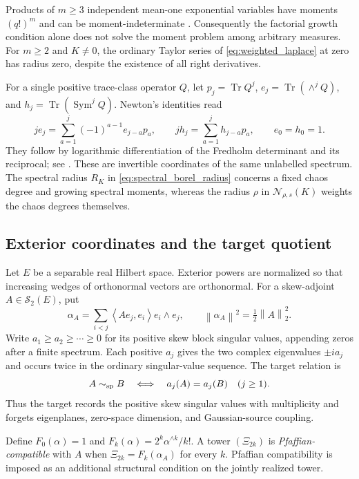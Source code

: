 \documentclass[11pt,a4paper]{amsart}
\numberwithin{equation}{section}
\theoremstyle{definition}
\theoremstyle{remark}
\newcommand{\Sch}{\mathcal S}
\DeclareMathOperator{\Tr}{Tr}
\DeclareMathOperator{\Sym}{Sym}
\newcommand{\norm}[1]{\left\lVert#1\right\rVert}
\newcommand{\ip}[2]{\left\langle#1,#2\right\rangle}
\newcommand{\Nn}[2]{\mathcal N_{#1,s}(#2)}
\begin{document}
Products of $m\ge3$ independent mean-one exponential variables have moments $(q!)^m$ and can be moment-indeterminate \cite{LS}. Consequently the factorial growth condition alone does not solve the moment problem among arbitrary measures. For $m\ge2$ and $K\ne0$, the ordinary Taylor series of \eqref{eq:weighted_laplace} at zero has radius zero, despite the existence of all right derivatives.

For a single positive trace-class operator $Q$, let $p_j=\Tr Q^j$, $e_j=\Tr(\wedge^jQ)$, and $h_j=\Tr(\Sym^jQ)$. Newton's identities read
\begin{equation}\label{eq:newton_spectral}
 je_j=\sum_{a=1}^j(-1)^{a-1}e_{j-a}p_a,\qquad
 jh_j=\sum_{a=1}^jh_{j-a}p_a,\qquad e_0=h_0=1.
\end{equation}
They follow by logarithmic differentiation of the Fredholm determinant and its reciprocal; see \cite{Macdonald,Bornemann}. These are invertible coordinates of the same unlabelled spectrum. The spectral radius $R_K$ in \eqref{eq:spectral_borel_radius} concerns a fixed chaos degree and growing spectral moments, whereas the radius $\rho$ in $\Nn\rho K$ weights the chaos degrees themselves.

\subsection{Exterior coordinates and the target quotient}
Let $E$ be a separable real Hilbert space. Exterior powers are normalized so that increasing wedges of orthonormal vectors are orthonormal. For a skew-adjoint $A\in\Sch_2(E)$, put
\begin{equation}\label{eq:pfaffian_form}
 \alpha_A=\sum_{i<j}\ip{Ae_j}{e_i}e_i\wedge e_j,
 \qquad \norm{\alpha_A}^2=\tfrac12\norm A_2^2.
\end{equation}
Write $a_1\ge a_2\ge\cdots\ge0$ for its positive skew block singular values, appending zeros after a finite spectrum. Each positive $a_j$ gives the two complex eigenvalues $\pm ia_j$ and occurs twice in the ordinary singular-value sequence. The target relation is
\[
 A\sim_{\rm sp}B\quad\Longleftrightarrow\quad a_j(A)=a_j(B)\quad(j\ge1).
\]
Thus the target records the positive skew singular values with multiplicity and forgets eigenplanes, zero-space dimension, and Gaussian-source coupling.

Define $F_0(\alpha)=1$ and $F_k(\alpha)=2^k\alpha^{\wedge k}/k!$. A tower $(\Xi_{2k})$ is \emph{Pfaffian-compatible} with $A$ when $\Xi_{2k}=F_k(\alpha_A)$ for every $k$. Pfaffian compatibility is imposed as an additional structural condition on the jointly realized tower.
\end{document}

